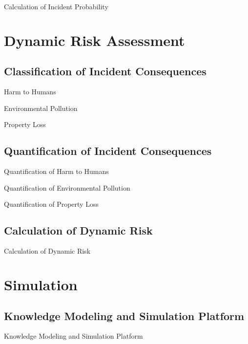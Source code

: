 \documentclass[10pt, compress]{beamer}
\begin{document}
\begin{frame}{Calculation of Incident Probability}
\end{frame}

\section{Dynamic Risk Assessment}
\subsection{Classification of Incident Consequences}
\begin{frame}{Harm to Humans}
\end{frame}

\begin{frame}{Environmental Pollution}
\end{frame}

\begin{frame}{Property Loss}
\end{frame}

\subsection{Quantification of Incident Consequences}
\begin{frame}{Quantification of Harm to Humans}
\end{frame}

\begin{frame}{Quantification of Environmental Pollution}
\end{frame}

\begin{frame}{Quantification of Property Loss}
\end{frame}

\subsection{Calculation of Dynamic Risk}
\begin{frame}{Calculation of Dynamic Risk}
\end{frame}

\section{Simulation}
\subsection{Knowledge Modeling and Simulation Platform}
\begin{frame}{Knowledge Modeling and Simulation Platform}
\end{frame}
\end{document}
